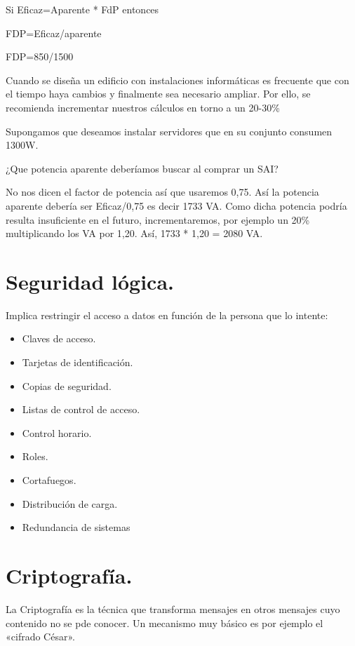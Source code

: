 \documentclass[letterpaper,10pt,spanish]{sphinxmanual}
\begin{document}
Si Eficaz=Aparente * FdP entonces

FDP=Eficaz/aparente

FDP=850/1500

Cuando se diseña un edificio con instalaciones informáticas es frecuente que con el tiempo haya cambios y finalmente sea necesario ampliar. Por ello, se recomienda incrementar nuestros cálculos en torno a un 20-30\%

Supongamos que deseamos instalar servidores que en su conjunto consumen 1300W.

¿Que potencia aparente deberíamos buscar al comprar un SAI?

No nos dicen el factor de potencia así que usaremos 0,75. Así la potencia aparente debería ser Eficaz/0,75 es decir 1733 VA. Como dicha potencia podría resulta insuficiente en el futuro, incrementaremos, por ejemplo un 20\% multiplicando los VA por 1,20. Así, 1733 * 1,20 = 2080 VA.


\section{Seguridad lógica.}
\label{\detokenize{tema_pautas_seguridad_informatica/tema_pautas_seguridad_informatica:seguridad-logica}}
Implica  restringir el acceso a datos en función de la persona que lo intente:
\begin{itemize}
\item {} 
Claves de acceso.

\item {} 
Tarjetas de identificación.

\item {} 
Copias de seguridad.

\item {} 
Listas de control de acceso.

\item {} 
Control horario.

\item {} 
Roles.

\item {} 
Cortafuegos.

\item {} 
Distribución de carga.

\item {} 
Redundancia de sistemas

\end{itemize}


\section{Criptografía.}
\label{\detokenize{tema_pautas_seguridad_informatica/tema_pautas_seguridad_informatica:criptografia}}
La Criptografía es la técnica que transforma mensajes en otros mensajes cuyo contenido no se pde conocer. Un mecanismo muy básico es por ejemplo el «cifrado César».
\end{document}
